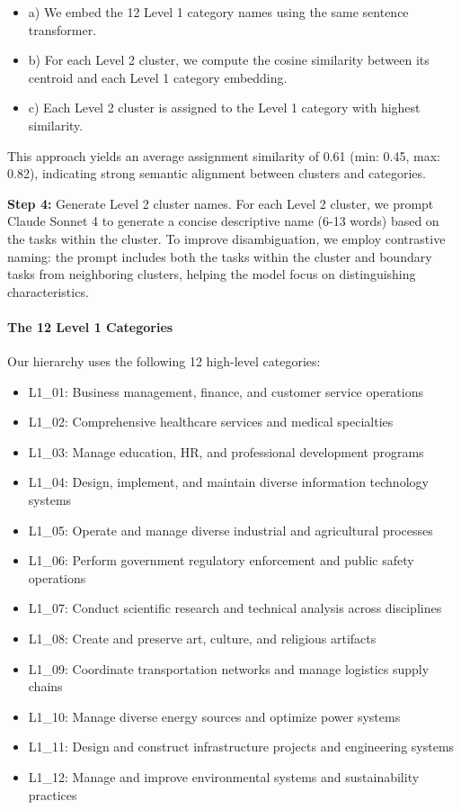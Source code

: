 \documentclass[manuscript,screen,nonacm,oneside]{acmart}
\begin{document}
\begin{itemize}
\item
 a) We embed the 12 Level 1 category names using the same sentence transformer.
\item
 b) For each Level 2 cluster, we compute the cosine similarity between its centroid and each Level 1 category embedding.
\item
 c) Each Level 2 cluster is assigned to the Level 1 category with highest similarity.
\end{itemize}

This approach yields an average assignment similarity of 0.61 (min: 0.45, max: 0.82), indicating strong semantic alignment between clusters and categories.

\textbf{Step 4:} Generate Level 2 cluster names. For each Level 2 cluster, we prompt Claude Sonnet 4 to generate a concise descriptive name (6-13 words) based on the tasks within the cluster. To improve disambiguation, we employ contrastive naming: the prompt includes both the tasks within the cluster and boundary tasks from neighboring clusters, helping the model focus on distinguishing characteristics.

\paragraph{The 12 Level 1 Categories}\label{the-12-level-1-categories}

Our hierarchy uses the following 12 high-level categories:

\begin{itemize}
\item
 L1\_01: Business management, finance, and customer service operations
\item
 L1\_02: Comprehensive healthcare services and medical specialties
\item
 L1\_03: Manage education, HR, and professional development programs
\item
 L1\_04: Design, implement, and maintain diverse information technology systems
\item
 L1\_05: Operate and manage diverse industrial and agricultural processes
\item
 L1\_06: Perform government regulatory enforcement and public safety operations
\item
 L1\_07: Conduct scientific research and technical analysis across disciplines
\item
 L1\_08: Create and preserve art, culture, and religious artifacts
\item
 L1\_09: Coordinate transportation networks and manage logistics supply chains
\item
 L1\_10: Manage diverse energy sources and optimize power systems
\item
 L1\_11: Design and construct infrastructure projects and engineering systems
\item
 L1\_12: Manage and improve environmental systems and sustainability practices
\end{itemize}
\end{document}
